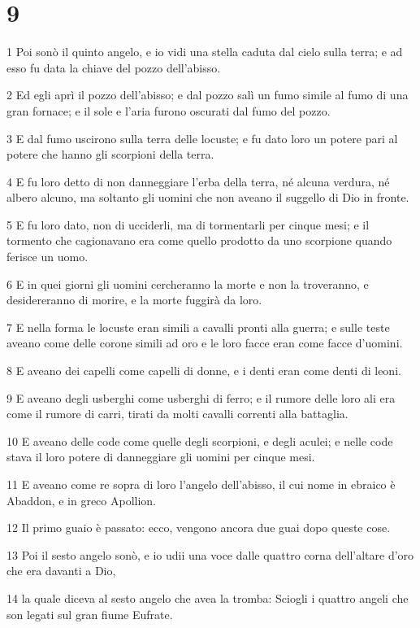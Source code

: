 \chapter{9}

\par 1 Poi sonò il quinto angelo, e io vidi una stella caduta dal cielo sulla terra; e ad esso fu data la chiave del pozzo dell'abisso.
\par 2 Ed egli aprì il pozzo dell'abisso; e dal pozzo salì un fumo simile al fumo di una gran fornace; e il sole e l'aria furono oscurati dal fumo del pozzo.
\par 3 E dal fumo uscirono sulla terra delle locuste; e fu dato loro un potere pari al potere che hanno gli scorpioni della terra.
\par 4 E fu loro detto di non danneggiare l'erba della terra, né alcuna verdura, né albero alcuno, ma soltanto gli uomini che non aveano il suggello di Dio in fronte.
\par 5 E fu loro dato, non di ucciderli, ma di tormentarli per cinque mesi; e il tormento che cagionavano era come quello prodotto da uno scorpione quando ferisce un uomo.
\par 6 E in quei giorni gli uomini cercheranno la morte e non la troveranno, e desidereranno di morire, e la morte fuggirà da loro.
\par 7 E nella forma le locuste eran simili a cavalli pronti alla guerra; e sulle teste aveano come delle corone simili ad oro e le loro facce eran come facce d'uomini.
\par 8 E aveano dei capelli come capelli di donne, e i denti eran come denti di leoni.
\par 9 E aveano degli usberghi come usberghi di ferro; e il rumore delle loro ali era come il rumore di carri, tirati da molti cavalli correnti alla battaglia.
\par 10 E aveano delle code come quelle degli scorpioni, e degli aculei; e nelle code stava il loro potere di danneggiare gli uomini per cinque mesi.
\par 11 E aveano come re sopra di loro l'angelo dell'abisso, il cui nome in ebraico è Abaddon, e in greco Apollion.
\par 12 Il primo guaio è passato: ecco, vengono ancora due guai dopo queste cose.
\par 13 Poi il sesto angelo sonò, e io udii una voce dalle quattro corna dell'altare d'oro che era davanti a Dio,
\par 14 la quale diceva al sesto angelo che avea la tromba: Sciogli i quattro angeli che son legati sul gran fiume Eufrate.
